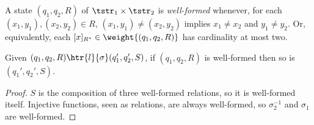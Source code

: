\begin{definition}
A state $(q_1,q_2,R)$ of $\tstr_1 \times \tstr_2$ is \emph{well-formed} whenever, for each $(x_1,y_1),(x_2,y_2) \in R$, $(x_1,y_1) \neq (x_2,y_2)$ implies $x_1 \neq x_2$ and $y_1 \neq y_2$. Or, equivalently, each $[x]_{R^*} \in \weight{(q_1,q_2,R)}$ has cardinality at most two.
\end{definition}

\begin{proposition}
Given $(q_1,q_2,R) \htr{l}{\sigma} (q_1',q_2',S)$, if $(q_1,q_2,R)$ is well-formed then so is $(q_1',q_2',S)$.
\end{proposition}
\begin{proof}
$S$ is the composition of three well-formed relations, so it is well-formed itself. Injective functions, seen as relations, are always well-formed, so $\sigma_2^{-1}$ and $\sigma_1$ are well-formed.
\end{proof}

